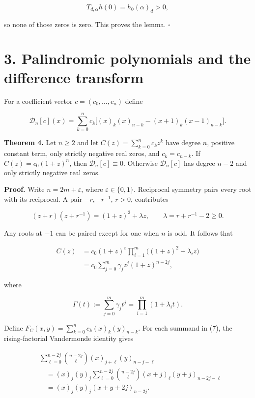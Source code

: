 \documentclass[11pt]{article}
\begin{document}
\[
T_{d,\alpha}h(0)=h_0(\alpha)_d>0,
\]

so none of those zeros is zero. This proves the lemma. \(\square\)

\section{3. Palindromic polynomials and the difference
transform}\label{palindromic-polynomials-and-the-difference-transform}

For a coefficient vector \(c=(c_0,\ldots,c_n)\) define

\[
\mathcal D_n[c](x)=\sum_{k=0}^n c_k
\bigl[(x)_k(x)_{n-k}-(x+1)_k(x-1)_{n-k}\bigr].
\tag{6}
\]

\textbf{Theorem 4.} Let \(n\ge2\) and let \(C(z)=\sum_{k=0}^n c_kz^k\)
have degree \(n\), positive constant term, only strictly negative real
zeros, and \(c_k=c_{n-k}\). If \(C(z)=c_0(1+z)^n\), then
\(\mathcal D_n[c]\equiv0\). Otherwise \(\mathcal D_n[c]\) has degree
\(n-2\) and only strictly negative real zeros.

\textbf{Proof.} Write \(n=2m+\varepsilon\), where
\(\varepsilon\in\{0,1\}\). Reciprocal symmetry pairs every root with its
reciprocal. A pair \(-r,-r^{-1}\), \(r>0\), contributes

\[
(z+r)(z+r^{-1})=(1+z)^2+\lambda z,
\qquad \lambda=r+r^{-1}-2\ge0.
\]

Any roots at \(-1\) can be paired except for one when \(n\) is odd. It
follows that

\[
\begin{aligned}
C(z)&=c_0(1+z)^\varepsilon
\prod_{i=1}^m\bigl((1+z)^2+\lambda_i z\bigr)\\
&=c_0\sum_{j=0}^m\gamma_jz^j(1+z)^{n-2j},
\end{aligned}
\tag{7}
\]

where

\[
\Gamma(t):=\sum_{j=0}^m\gamma_jt^j
=\prod_{i=1}^m(1+\lambda_it).
\tag{8}
\]

Define \(F_C(x,y)=\sum_{k=0}^n c_k(x)_k(y)_{n-k}\). For each summand in
(7), the rising-factorial Vandermonde identity gives

\[
\begin{aligned}
&\sum_{\ell=0}^{n-2j}\binom{n-2j}{\ell}
(x)_{j+\ell}(y)_{n-j-\ell}\\
&\quad=(x)_j(y)_j
\sum_{\ell=0}^{n-2j}\binom{n-2j}{\ell}
(x+j)_\ell(y+j)_{n-2j-\ell}\\
&\quad=(x)_j(y)_j(x+y+2j)_{n-2j}.
\end{aligned}
\]
\end{document}
